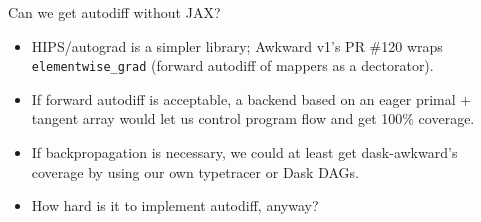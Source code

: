 \documentclass[aspectratio=169]{beamer}
\begin{document}
\begin{frame}{Can we get autodiff without JAX?}
\large
\vspace{0.5 cm}
\begin{itemize}\setlength{\itemsep}{0.5 cm}
\item<1-> HIPS/autograd is a simpler library; Awkward v1's PR \#120 wraps \texttt{elementwise_grad} (forward autodiff of mappers as a dectorator).
\item<2-> If forward autodiff is acceptable, a backend based on an eager primal + tangent array would let us control program flow and get 100\% coverage.
\item<3-> If backpropagation is necessary, we could at least get dask-awkward's coverage by using our own typetracer or Dask DAGs.
\item<4-> How hard is it to implement autodiff, anyway?
\end{itemize}
\end{frame}
\end{document}
